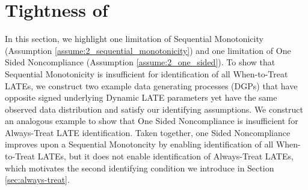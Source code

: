 \section{Tightness of }


In this section, we highlight one limitation of Sequential Monotonicity (Assumption \ref{assume:2_sequential_monotonicity}) and one limitation of One Sided Noncompliance (Assumption \ref{assume:2_one_sided}).
To show that Sequential Monotonicity is insufficient for identification of all When-to-Treat LATEs, we construct two example data generating processes (DGPs) that have opposite signed underlying Dynamic LATE parameters yet have the same observed data distribution and satisfy our identifying assumptions.
We construct an analogous example to show that One Sided Noncompliance is insufficient for Always-Treat LATE identification.
Taken together, one Sided Noncompliance improves upon a Sequential Monotoncity by enabling identification of all When-to-Treat LATEs, but it does not enable identification of Always-Treat LATEs, which motivates the second identifying condition we introduce in Section \ref{sec:always-treat}.

